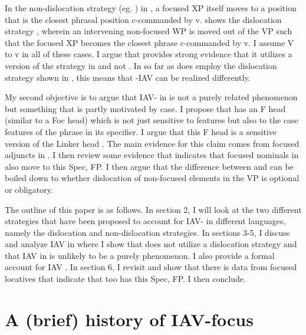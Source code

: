 \documentclass[output=paper,newtxmath,modfonts,nonflat,draft]{langsci/langscibook}
\begin{document}
In the non-dislocation strategy (eg. \citealt{vanderwal2006}) in , a focused XP itself moves to a position that is the closest phrasal position c-commanded by v.  shows the dislocation strategy \citep{ChengDowning2009}, wherein an intervening non-focused WP is moved out of the VP such that the focused XP becomes the closest phrase c-commanded by v. I assume V to v  in all of these cases. I argue that  provides strong evidence that it utilizes a version of the strategy in  and not . In so far as  does employ the dislocation strategy shown in , this means that -IAV  can be realized differently. 

My second objective is to argue that IAV- in  is not a purely  related phenomenon but something that is partly motivated by case. I propose that  has an F head (similar to a Foc head) which is not just sensitive to  features but also to the case features of the phrase in its specifier. I argue that this F head is a  sensitive version of the Linker head \citep{Baker2006}. The main evidence for this claim comes from focused adjuncts in . I then review some evidence that indicates that focused nominals in  also move to this Spec, FP. I then argue that the difference between  and  can be boiled down to whether dislocation of non-focused elements in the VP is optional or obligatory.

The outline of this paper is as follows. In section 2, I will look at the two different strategies that have been proposed to account for IAV- in different  languages, namely the dislocation and non-dislocation strategies. In sections 3-5, I discuss and analyze IAV  in  where I show that  does not utilize a dislocation strategy and that IAV  in  is unlikely to be a purely  phenomenon. I also provide a formal account for  IAV . In section 6, I revisit  and show that there is data from focused locatives that indicate that  too has this Spec, FP. I then conclude.

\section{A (brief) history of IAV-focus}
\end{document}
